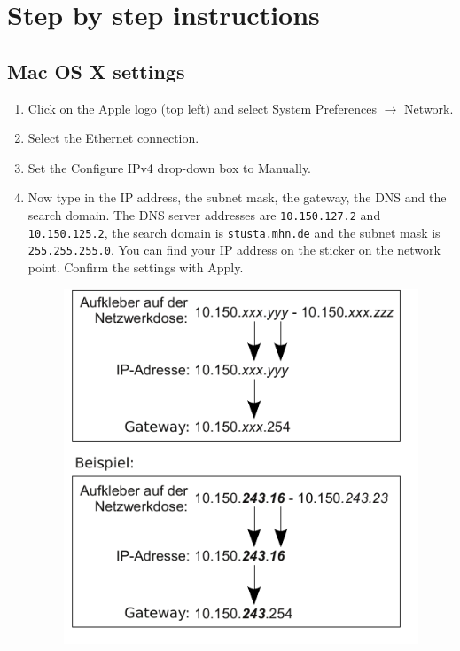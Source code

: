\documentclass[a4paper,12pt]{scrartcl}
\begin{document}
\section*{Step by step instructions}
\subsection*{Mac OS X settings}
\begin{enumerate}
    \item Click on the Apple logo (top left) and select System Preferences $\rightarrow$ Network.
    \item Select the Ethernet connection.
    \item Set the Configure IPv4 drop-down box to Manually.
    \item Now type in the IP address, the subnet mask, the gateway, the DNS and the search domain. The DNS server addresses are \nolinkurl{10.150.127.2} and \nolinkurl{10.150.125.2}, the search domain is \nolinkurl{stusta.mhn.de} and the subnet mask is \nolinkurl{255.255.255.0}. You can find your IP address on the sticker on the network point. Confirm the settings with Apply.
      \begin{figure}[h!]
      \centering
        \begin{minipage}[c]{0.38\linewidth}
          \centering
          \includegraphics[width=\linewidth,keepaspectratio]{Bilder/IP_Gerneric}

\end{minipage}
\end{figure}
\end{enumerate}
\end{document}
